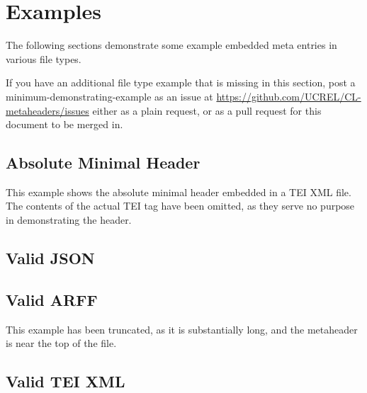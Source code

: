\chapter{Examples}
The following sections demonstrate some example embedded meta entries in various file types.

If you have an additional file type example that is missing in this section, post a minimum-demonstrating-example as an issue at \url{https://github.com/UCREL/CL-metaheaders/issues} either as a plain request, or as a pull request for this document to be merged in.

\section{Absolute Minimal Header}
This example shows the absolute minimal header embedded in a TEI XML file.
The contents of the actual TEI tag have been omitted, as they serve no purpose in demonstrating the header.


\section{Valid JSON}


\section{Valid ARFF}
This example has been truncated, as it is substantially long, and the metaheader is near the top of the file.


\section{Valid TEI XML}
